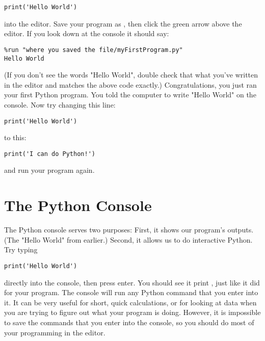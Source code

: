 \begin{Verbatim}
print('Hello World')
\end{Verbatim}

into the editor. Save your program as , then click the green
arrow above the editor. If you look down at the console it should say:

\begin{Verbatim}
%run "where you saved the file/myFirstProgram.py"
Hello World
\end{Verbatim}
(If you don't see the words "Hello World", double check that what you've written in the editor and matches the above code exactly.) Congratulations, you just ran your first Python program. You told the computer to write "Hello World" on the console.
Now try changing this line:
\begin{Verbatim}
print('Hello World')
\end{Verbatim}
to this:
\begin{Verbatim}
print('I can do Python!')
\end{Verbatim}
and run your program again.
\section{The Python Console}
The Python console serves two purposes: First, it shows our program's outputs. (The "Hello World" from earlier.) Second, it allows us to do interactive Python. Try typing
\begin{Verbatim}
print('Hello World')
\end{Verbatim}
directly into the console, then press enter.  You should see it print
, just like it did for your program. The console
will run any Python command that you enter into it. It can be very
useful for short, quick calculations, or for looking at data when you
are trying to figure out what your program is doing. However, it is
impossible to save the commands that you enter into the console, so
you should do most of your programming in the editor.


